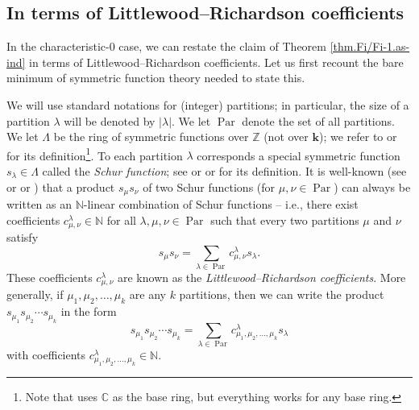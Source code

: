 \documentclass[numbers=enddot,12pt,final,onecolumn,notitlepage]{scrartcl}%
\theoremstyle{definition}
\let\sumnonlimits\sum
\renewcommand{\sum}{\sumnonlimits\limits}
\begin{document}
\subsection{In terms of Littlewood--Richardson coefficients}

In the characteristic-$0$ case, we can restate the claim of Theorem
\ref{thm.Fi/Fi-1.as-ind} in terms of Littlewood--Richardson coefficients. Let
us first recount the bare minimum of symmetric function theory needed to state this.

We will use standard notations for (integer) partitions; in particular, the
size of a partition $\lambda$ will be denoted by $\left\vert \lambda
\right\vert $. We let $\operatorname*{Par}$ denote the set of all partitions.
We let $\Lambda$ be the ring of symmetric functions over $\mathbb{Z}$ (not
over $\mathbf{k}$); we refer to \cite[\S 2.1]{GriRei} or \cite[\S 4.3]%
{Sagan-SG} for its definition\footnote{Note that \cite[\S 4.3]{Sagan-SG} uses
$\mathbb{C}$ as the base ring, but everything works for any base ring.}. To
each partition $\lambda$ corresponds a special symmetric function $s_{\lambda
}\in\Lambda$ called the \emph{Schur function}; see \cite[(2.2.4)]{GriRei} or
\cite[\S 4.4]{Sagan-SG} or \cite[Definition 5.3]{Egge19} for its definition.
It is well-known (see \cite[(4.26) and Theorem 4.9.4]{Sagan-SG} or
\cite[Definition 2.5.8 and Corollary 2.6.12]{GriRei} or \cite[Theorem
10.40]{Egge19}) that a product $s_{\mu}s_{\nu}$ of two Schur functions (for
$\mu,\nu\in\operatorname*{Par}$) can always be written as an $\mathbb{N}%
$-linear combination of Schur functions -- i.e., there exist coefficients
$c_{\mu,\nu}^{\lambda}\in\mathbb{N}$ for all $\lambda,\mu,\nu\in
\operatorname*{Par}$ such that every two partitions $\mu$ and $\nu$ satisfy%
\begin{equation}
s_{\mu}s_{\nu}=\sum_{\lambda\in\operatorname*{Par}}c_{\mu,\nu}^{\lambda
}s_{\lambda}. \label{eq.LR.2}%
\end{equation}
These coefficients $c_{\mu,\nu}^{\lambda}$ are known as the
\emph{Littlewood--Richardson coefficients}. More generally, if $\mu_{1}%
,\mu_{2},\ldots,\mu_{k}$ are any $k$ partitions, then we can write the product
$s_{\mu_{1}}s_{\mu_{2}}\cdots s_{\mu_{k}}$ in the form%
\begin{equation}
s_{\mu_{1}}s_{\mu_{2}}\cdots s_{\mu_{k}}=\sum_{\lambda\in\operatorname*{Par}%
}c_{\mu_{1},\mu_{2},\ldots,\mu_{k}}^{\lambda}s_{\lambda} \label{eq.LR.k}%
\end{equation}
with coefficients $c_{\mu_{1},\mu_{2},\ldots,\mu_{k}}^{\lambda}\in\mathbb{N}$.
\end{document}
